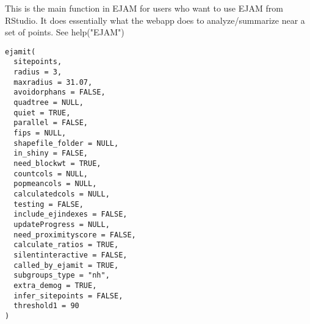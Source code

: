 \documentclass[a4paper]{book}
\begin{document}
%
\begin{Description}\relax
This is the main function in EJAM for users who want to use EJAM from RStudio.
It does essentially what the webapp does to analyze/summarize near a set of points.
See help("EJAM")
\end{Description}
%
\begin{Usage}
\begin{verbatim}
ejamit(
  sitepoints,
  radius = 3,
  maxradius = 31.07,
  avoidorphans = FALSE,
  quadtree = NULL,
  quiet = TRUE,
  parallel = FALSE,
  fips = NULL,
  shapefile_folder = NULL,
  in_shiny = FALSE,
  need_blockwt = TRUE,
  countcols = NULL,
  popmeancols = NULL,
  calculatedcols = NULL,
  testing = FALSE,
  include_ejindexes = FALSE,
  updateProgress = NULL,
  need_proximityscore = FALSE,
  calculate_ratios = TRUE,
  silentinteractive = FALSE,
  called_by_ejamit = TRUE,
  subgroups_type = "nh",
  extra_demog = TRUE,
  infer_sitepoints = FALSE,
  threshold1 = 90
)
\end{verbatim}
\end{Usage}
%
\end{document}
